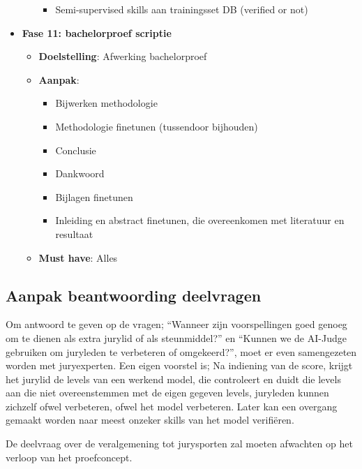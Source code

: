 \begin{itemize}
\begin{itemize}
\begin{itemize}
            \item Semi-supervised skills aan trainingsset DB (verified or not)
        \end{itemize}
    \end{itemize}
    \item \textbf{Fase 11: bachelorproef scriptie}
    \begin{itemize}
        \item \textbf{Doelstelling}: Afwerking bachelorproef
        \item \textbf{Aanpak}:
        \begin{itemize}
            \item Bijwerken methodologie
            \item Methodologie finetunen (tussendoor bijhouden)
            \item Conclusie
            \item Dankwoord
            \item Bijlagen finetunen
            \item Inleiding en abstract finetunen, die overeenkomen met literatuur en resultaat
        \end{itemize}
        \item \textbf{Must have}: Alles
    \end{itemize}
\end{itemize}


\subsection{Aanpak beantwoording deelvragen}
\label{subsec:methodologie-deelvragen}


Om antwoord te geven op de vragen; ``Wanneer zijn voorspellingen goed genoeg om te dienen als extra jurylid of als steunmiddel?'' en ``Kunnen we de AI-Judge gebruiken om juryleden te verbeteren of omgekeerd?'', moet er even samengezeten worden met juryexperten.
Een eigen voorstel is; Na indiening van de score, krijgt het jurylid de levels van een werkend model, die controleert en duidt die levels aan die niet overeenstemmen met de eigen gegeven levels, juryleden kunnen zichzelf ofwel verbeteren, ofwel het model verbeteren. Later kan een overgang gemaakt worden naar meest onzeker skills van het model verifiëren.

De deelvraag over de veralgemening tot jurysporten zal moeten afwachten op het verloop van het proefconcept.

